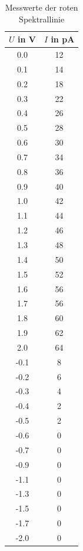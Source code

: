 \begin{table}
    \centering 
    \caption{Messwerte der roten Spektrallinie}
\begin{tabular}{c c}
    \toprule
    $U$ in V&$I$ in pA \\
    \midrule
                0.0&12 \\
                0.1&14 \\
                0.2&18 \\
                0.3&22 \\
                0.4&26 \\
                0.5&28 \\
                0.6&30 \\
                0.7&34 \\
                0.8&36 \\
                0.9&40 \\
                1.0&42 \\
                1.1&44 \\
                1.2&46 \\
                1.3&48 \\
                1.4&50 \\
                1.5&52 \\
                1.6&56 \\
                1.7&56 \\
                1.8&60 \\
                1.9&62 \\
                2.0&64 \\
                -0.1&8 \\
                -0.2&6 \\
                -0.3&4 \\
                -0.4&2 \\
                -0.5&2 \\
                -0.6&0 \\
                -0.7&0 \\
                -0.9&0 \\
                -1.1&0 \\
                -1.3&0 \\
                -1.5&0 \\
                -1.7&0 \\
                -2.0&0 \\
    \bottomrule
    \end{tabular}
    \label{tab:rot}
\end{table}
    
